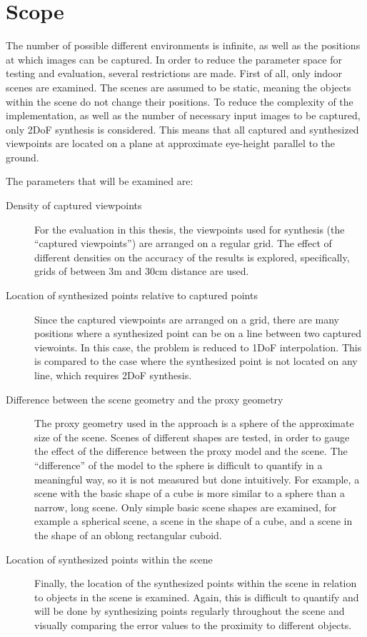 \section*{Scope}
The number of possible different environments is infinite, as well as the positions at which images can be captured. In order to reduce the parameter space for testing and evaluation, several restrictions are made. First of all, only indoor scenes are examined. The scenes are assumed to be static, meaning the objects within the scene do not change their positions. To reduce the complexity of the implementation, as well as the number of necessary input images to be captured, only 2DoF synthesis is considered. This means that all captured and synthesized viewpoints are located on a plane at approximate eye-height parallel to the ground. 


The parameters that will be examined are:
\begin{description}
  \item[Density of captured viewpoints] For the evaluation in this thesis, the viewpoints used for synthesis (the ``captured viewpoints'') are arranged on a regular grid. The effect of different densities on the accuracy of the results is explored, specifically, grids of between 3m and 30cm distance are used.
  \item[Location of synthesized points relative to captured points] Since the captured viewpoints are arranged on a grid, there are many positions where a synthesized point can be on a line between two captured viewoints. In this case, the problem is reduced to 1DoF interpolation. This is compared to the case where the synthesized point is not located on any line, which requires 2DoF synthesis.
  \item[Difference between the scene geometry and the proxy geometry] The proxy geometry used in the approach is a sphere of the approximate size of the scene. Scenes of different shapes are tested, in order to gauge the effect of the difference between the proxy model and the scene. The ``difference'' of the model to the sphere is difficult to quantify in a meaningful way, so it is not measured but done intuitively. For example, a scene with the basic shape of a cube is more similar to a sphere than a narrow, long scene. Only simple basic scene shapes are examined, for example a spherical scene, a scene in the shape of a cube, and a scene in the shape of an oblong rectangular cuboid.
  \item[Location of synthesized points within the scene] Finally, the location of the synthesized points within the scene in relation to objects in the scene is examined. Again, this is difficult to quantify and will be done by synthesizing points regularly throughout the scene and visually comparing the error values to the proximity to different objects.
\end{description}

